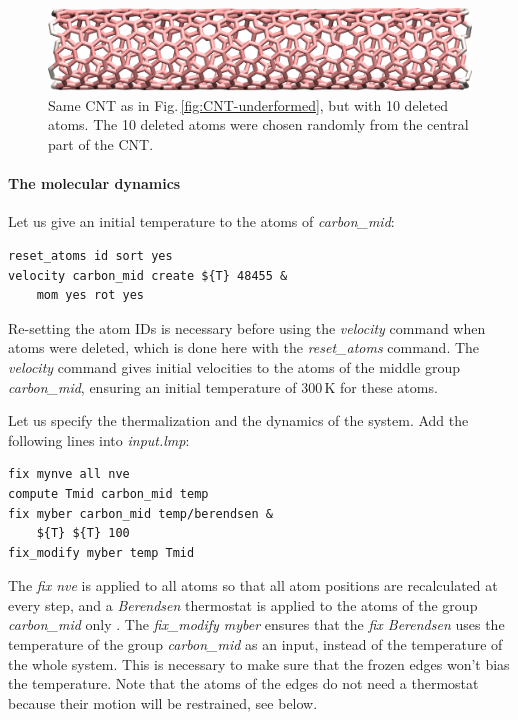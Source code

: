 \documentclass[9pt,tutorial]{livecoms}
\begin{document}
\begin{figure}
\centering
\includegraphics[width=\linewidth]{CNT-underformed-deleted}
\caption{Same CNT as in Fig.\,\ref{fig:CNT-underformed}, but with 10 deleted atoms.
The 10 deleted atoms were chosen randomly from the central part of the CNT.}
\label{fig:CNT-underformed-deleted}
\end{figure}

\paragraph{The molecular dynamics}

Let us give an initial temperature to the atoms of \textit{carbon\_mid}:
{\normalsize \begin{verbatim}
reset_atoms id sort yes
velocity carbon_mid create ${T} 48455 &
    mom yes rot yes
\end{verbatim}}
Re-setting the atom IDs is necessary before using the \textit{velocity} command
when atoms were deleted, which is done here with the \textit{reset\_atoms} command.
The \textit{velocity} command gives initial velocities to the atoms of the middle
group \textit{carbon\_mid}, ensuring an initial temperature of $300\,\text{K}$
for these atoms.

Let us specify the thermalization and the dynamics of the system. Add the following
lines into \textit{input.lmp}:
{\normalsize \begin{verbatim}
fix mynve all nve
compute Tmid carbon_mid temp
fix myber carbon_mid temp/berendsen &
    ${T} ${T} 100
fix_modify myber temp Tmid
\end{verbatim}}
 The \textit{fix nve}
is applied to all atoms so that all atom positions are recalculated at every step,
and a \textit{Berendsen} thermostat is applied to the atoms of the group
\textit{carbon\_mid} only \cite{berendsen1984molecular}. The
\textit{fix\_modify myber} ensures that the \textit{fix Berendsen} uses the
temperature of the group \textit{carbon\_mid} as an input, instead of the
temperature of the whole system. This is necessary to make sure that the frozen
edges won't bias the temperature. Note that the atoms of the edges do not need
a thermostat because their motion will be restrained, see below.
\end{document}
